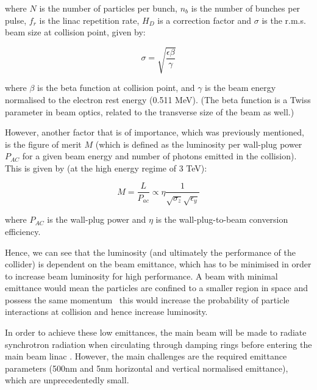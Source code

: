 where $N$ is the number of particles per bunch, $n_b$ is the number of bunches per pulse, $f_r$ is the linac repetition rate, $H_D$ is a correction factor and $\sigma$ is the r.m.s. beam size at collision point, given by:

\begin{equation}
    \sigma = \sqrt{\frac{\epsilon \beta}{\gamma}}
\end{equation}


where $\beta$ is the beta function at collision point, and $\gamma$ is the beam energy normalised to the electron rest energy (0.511 MeV). (The beta function is a Twiss parameter in beam optics, related to the transverse size of the beam as well.)

However, another factor that is of importance, which was previously mentioned, is the figure of merit $M$ (which is defined as the luminosity per wall-plug power $P_{AC}$ for a given beam energy and number of photons emitted in the collision). This is given by (at the high energy regime of 3 TeV):

\begin{equation}
    M = \frac{L}{P_{ac}} \propto \eta \frac{1}{\sqrt{\sigma_z}\sqrt{\epsilon_y}}
\end{equation}


where $P_{AC}$ is the wall-plug power and $\eta$ is the wall-plug-to-beam conversion efficiency.

Hence, we can see that the luminosity (and ultimately the performance of the collider) is dependent on the beam emittance, which has to be minimised in order to increase beam luminosity for high performance. A beam with minimal emittance would mean the particles are confined to a smaller region in space and possess the same momentum \textemdash \, this would increase the probability of particle interactions at collision and hence increase luminosity.

In order to achieve these low emittances, the main beam will be made to radiate synchrotron radiation when circulating through damping rings before entering the main beam linac \cite{CLIC:Concept}. However, the main challenges are the required emittance parameters (500nm and 5nm horizontal and vertical normalised emittance), which are unprecedentedly small.

